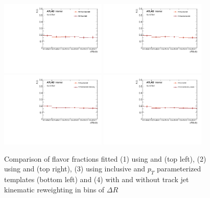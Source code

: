 \begin{figure}[htbp]
  \centering
 \includegraphics[width=0.45\textwidth]{figures/gbb/Sub_Sd0_Fits/Canv_dR_leadCrossCheck.pdf}
 \includegraphics[width=0.45\textwidth]{figures/gbb/Sub_Sd0_Fits/Canv_dR_subsubCrossCheck.pdf}\\
 \includegraphics[width=0.45\textwidth]{figures/gbb/Sub_Sd0_Fits/Canv_dR_ptbinCrossCheck.pdf}
 \includegraphics[width=0.45\textwidth]{figures/gbb/Sub_Sd0_Fits/Canv_dR_noreweightCrossCheck.pdf}\\
\caption{Comparison of flavor fractions fitted (1) using \subsdzero and \sdzero (top left), (2) using \subsdzero and \subsubsdzero (top right), (3) using inclusive and $p_T$ parameterized templates (bottom left) and (4) with and without track jet kinematic reweighting in bins of $\Delta R$}
  \label{fig:dR-fitfrac-crosscheck}
\end{figure}


